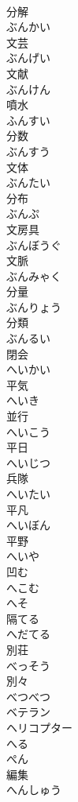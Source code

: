 \documentclass[8pt]{extreport}
\begin{document}
\begin{CJK}{UTF8}{min}
\\	分解 
\\	ぶんかい	
\\	文芸 
\\	ぶんげい	
\\	文献 
\\	ぶんけん	
\\	噴水 
\\	ふんすい	
\\	分数 
\\	ぶんすう	
\\	文体 
\\	ぶんたい	
\\	分布 
\\	ぶんぷ	
\\	文房具 
\\	ぶんぼうぐ	
\\	文脈 
\\	ぶんみゃく	
\\	分量 
\\	ぶんりょう	
\\	分類 
\\	ぶんるい	
\\	閉会 
\\	へいかい	
\\	平気 
\\	へいき	
\\	並行 
\\	へいこう	
\\	平日 
\\	へいじつ	
\\	兵隊 
\\	へいたい	
\\	平凡 
\\	へいぼん	
\\	平野 
\\	へいや	
\\	凹む 
\\	へこむ	
\\	へそ	
\\	隔てる 
\\	へだてる	
\\	別荘 
\\	べっそう	
\\	別々 
\\	べつべつ	
\\	ベテラン	
\\	ヘリコプター	
\\	へる	
\\	ぺん	
\\	編集 
\\	へんしゅう	

\end{CJK}
\end{document}
